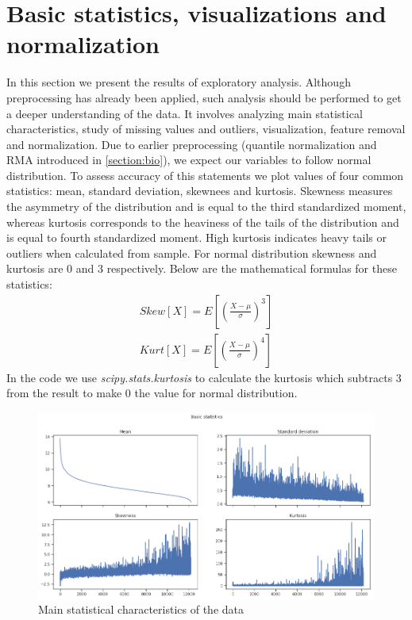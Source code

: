 \documentclass[shortabstract, english, mgr]{iithesis}
\begin{document}
\section{Basic statistics, visualizations and normalization}

In this section we present the results of exploratory analysis. Although preprocessing has already been applied, such analysis should be performed to get a deeper understanding of the data. It involves analyzing main statistical characteristics, study of missing values and outliers, visualization, feature removal and normalization. Due to earlier preprocessing (quantile normalization and RMA introduced in \ref{section:bio}), we expect our variables to follow normal distribution. To assess accuracy of this statements we plot values of four common statistics: mean, standard deviation, skewnees and kurtosis. Skewness measures the asymmetry of the distribution and is equal to the third standardized moment, whereas kurtosis corresponds to the heaviness of the tails of the distribution and is equal to fourth standardized moment. High kurtosis indicates heavy tails or outliers when calculated from sample. For normal distribution skewness and kurtosis are $0$ and $3$ respectively. Below are the mathematical formulas for these statistics:
\begin{align}
    Skew[X] = E\left[\left(\frac{X-\mu}{\sigma}\right)^3 \right] \nonumber \\
    Kurt[X] = E\left[\left(\frac{X-\mu}{\sigma}\right)^4 \right] \nonumber
\end{align}
In the code we use \textit{scipy.stats.kurtosis} to calculate the kurtosis which subtracts $3$ from the result to make $0$ the value for normal distribution. 

\begin{figure}
\centering
\includegraphics[width=\textwidth]{images/basic_stats.png}
\caption{Main statistical characteristics of the data}
\label{fig:stats}
\end{figure}
\end{document}
